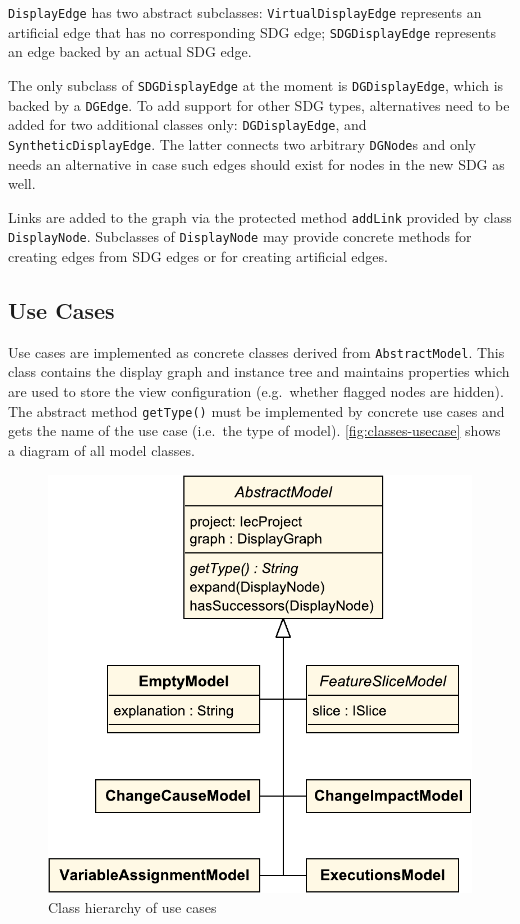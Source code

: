\lstinline|DisplayEdge| has two abstract subclasses: \lstinline|VirtualDisplayEdge| represents an artificial edge that 
has no corresponding SDG edge; \lstinline|SDGDisplayEdge| represents an edge backed by an actual SDG edge.

The only subclass of \lstinline|SDGDisplayEdge| at the moment is \lstinline|DGDisplayEdge|, which is backed by a 
\lstinline|DGEdge|. To add support for other SDG types, alternatives need to be added for two additional classes 
only: \lstinline|DGDisplayEdge|, and \lstinline|SyntheticDisplayEdge|. The latter connects two arbitrary 
\lstinline|DGNode|s and only needs an alternative in case such edges should exist for nodes in the new SDG as well.

Links are added to the graph via the protected method \lstinline|addLink| provided by class \lstinline|DisplayNode|. 
Subclasses of \lstinline|DisplayNode| may provide concrete methods for creating edges from SDG edges or for creating 
artificial edges.

\subsection{Use Cases}

Use cases are implemented as concrete classes derived from \lstinline|AbstractModel|. This class contains the display 
graph and instance tree and maintains properties which are used to store the view configuration (e.g.\ whether flagged 
nodes are hidden). The abstract method \lstinline|getType()| must be implemented by concrete use cases and gets the 
name of the use case (i.e.\ the type of model). \autoref{fig:classes-usecase} shows a diagram of all model classes.

\begin{figure}[htb]
  \centering
    \includegraphics[scale=0.5]{bilder/classes-usecase}
  \caption{Class hierarchy of use cases}
  \label{fig:classes-usecase}
\end{figure}

